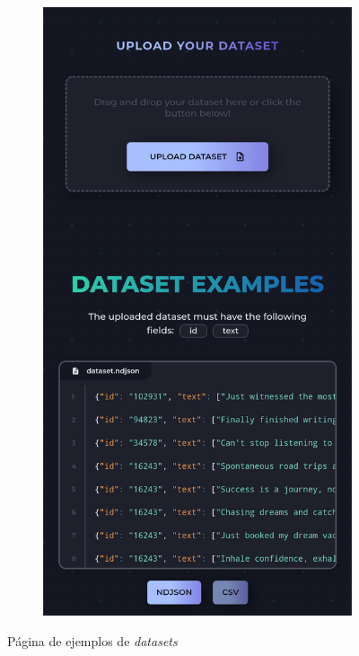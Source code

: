\begin{figure}[H]
\begin{subfigure}[c]{0.21\textwidth}
		\includegraphics[width=\textwidth]{imagenes/examples_movil.png}
		\label{fig:casouso_examples_movil}
	\end{subfigure}
	\vspace{-1\baselineskip}
	\caption{Página de ejemplos de \textit{datasets}}
	\label{fig:casouso_examples}
\end{figure}

